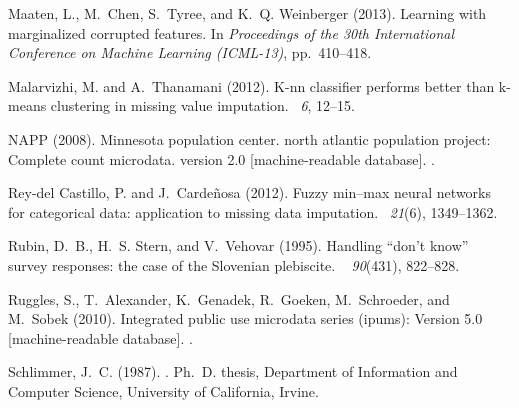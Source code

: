 \documentclass[10pt]{book}
\theoremstyle{definition}
\begin{document}
\begin{thebibliography}{11}
Maaten, L., M.~Chen, S.~Tyree, and K.~Q. Weinberger (2013).
\newblock Learning with marginalized corrupted features.
\newblock In {\em Proceedings of the 30th International Conference on Machine
  Learning (ICML-13)}, pp.\  410--418.

Malarvizhi, M. and A.~Thanamani (2012).
\newblock K-nn classifier performs better than k-means clustering in missing
  value imputation.
~{\em 6},
  12--15.

NAPP (2008).
\newblock Minnesota population center. north atlantic population project:
  Complete count microdata. version 2.0 [machine-readable database].
.

Rey-del Castillo, P. and J.~Carde{\~n}osa (2012).
\newblock Fuzzy min--max neural networks for categorical data: application to
  missing data imputation.
~{\em 21\/}(6), 1349--1362.

Rubin, D.~B., H.~S. Stern, and V.~Vehovar (1995).
\newblock Handling \enquote{don't know} survey responses: the case of the
  {S}lovenian plebiscite.
~{\em
  90\/}(431), 822--828.

Ruggles, S., T.~Alexander, K.~Genadek, R.~Goeken, M.~Schroeder, and M.~Sobek
  (2010).
\newblock Integrated public use microdata series (ipums): Version 5.0
  [machine-readable database].
.

Schlimmer, J.~C. (1987).
.
\newblock Ph.\ D. thesis, Department of Information and Computer Science,
  University of California, Irvine.


\end{thebibliography}
\end{document}
